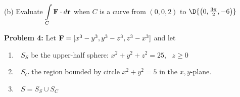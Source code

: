 \documentclass[12pt]{amsart}
\numberwithin{equation}{section}
\begin{document}

\vspace{15.4cm}

(b) Evaluate $\displaystyle{\int \limits_{C} \text{\bf F} \cdot  d\text{\bf r}}$ when $C$ is a curve from $(0,0,2)$ to $\D{\left(0,\frac{3\pi}{2},-6\right)}$

\thispagestyle{empty}
\newpage
\thispagestyle{empty}

\noindent
{\bf Problem 4:} Let ${\bf F} = [x^3-y^3,y^3-z^3,z^3-x^3]$ and let 

\begin{enumerate}
	\item[$i.$] \,\, $S_S$ be the upper-half sphere: $x^2 + y^2 + z^2 = 25$, \, $z \ge 0$
	\item[$ii.$] \,\, $S_C$ the region bounded by circle $x^2+y^2=5$ in the $x,y$-plane.
	\item[$iii.$] \,\, $S = S_S \cup S_C$
\end{enumerate}
\end{document}
